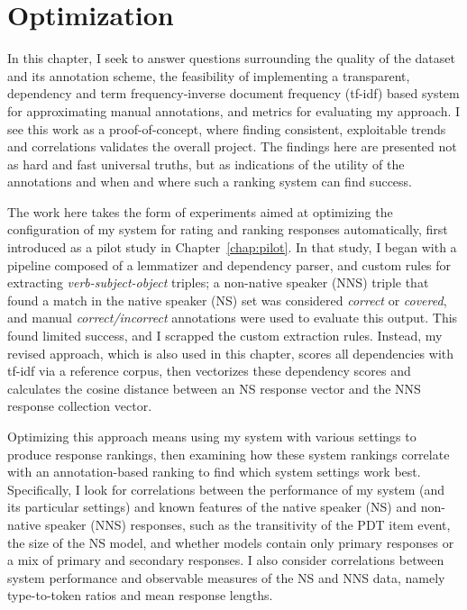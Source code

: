 \chapter{Optimization}
\label{chap:optimization}

In this chapter, I seek to answer questions surrounding the quality of the dataset and its annotation scheme, the feasibility of implementing a transparent, dependency and term frequency-inverse document frequency (tf-idf) based system for approximating manual annotations, and metrics for evaluating my approach. I see this work as a proof-of-concept, where finding consistent, exploitable trends and correlations validates the overall project. The findings here are presented not as hard and fast universal truths, but as indications of the utility of the annotations  and when and where such a ranking system can find success.

The work here takes the form of experiments aimed at optimizing the configuration of my system for rating and ranking responses automatically, first introduced as a pilot study in Chapter~\ref{chap:pilot}. In that study, I began with a pipeline composed of a lemmatizer and dependency parser, and custom rules for extracting \textit{verb-subject-object} triples; a non-native speaker (NNS) triple that found a match in the native speaker (NS) set was considered \textit{correct} or \textit{covered}, and manual \textit{correct/incorrect} annotations were used to evaluate this output. This found limited success, and I scrapped the custom extraction rules. Instead, my revised approach, which is also used in this chapter, scores all dependencies with tf-idf via a reference corpus, then vectorizes these dependency scores and calculates the cosine distance between an NS response vector and the NNS response collection vector.

Optimizing this approach means using my system with various settings to produce response rankings, then examining how these system rankings correlate with an annotation-based ranking to find which system settings work best. Specifically, I look for correlations between the performance of my system (and its particular settings) and known features of the native speaker (NS) and non-native speaker (NNS) responses, such as the transitivity of the PDT item event, the size of the NS model, and whether models contain only primary responses or a mix of primary and secondary responses. I also consider correlations between system performance and observable measures of the NS and NNS data, namely type-to-token ratios and mean response lengths.

